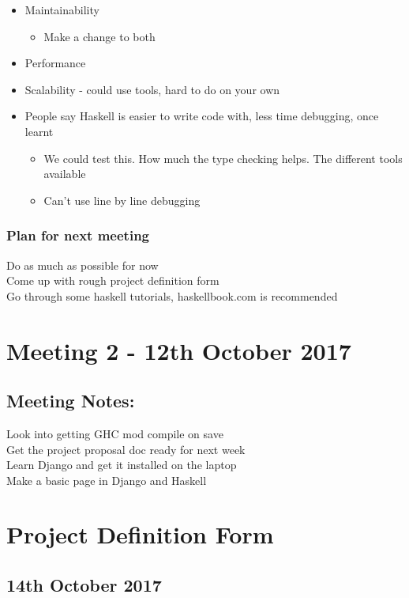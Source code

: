 \documentclass[a4paper,11pt]{article}
\begin{document}
\begin{itemize}
  \item Maintainability
  \begin{itemize}
    \item Make a change to both
  \end{itemize}
  \item Performance
  \item Scalability - could use tools, hard to do on your own
  \item People say Haskell is easier to write code with, less time debugging, once learnt
  \begin{itemize}
    \item We could test this. How much the type checking helps. The different tools available
    \item Can't use line by line debugging
  \end{itemize}
\end{itemize}

\subsubsection{Plan for next meeting}

Do as much as possible for now\\
Come up with rough project definition form\\
Go through some haskell tutorials, haskellbook.com is recommended

\section{Meeting 2 - 12th October 2017}

\subsection{Meeting Notes:}

Look into getting GHC mod compile on save\\
Get the project proposal doc ready for next week\\
Learn Django and get it installed on the laptop\\
Make a basic page in Django and Haskell

\section{Project Definition Form}

\subsection{14th October 2017}
\end{document}
